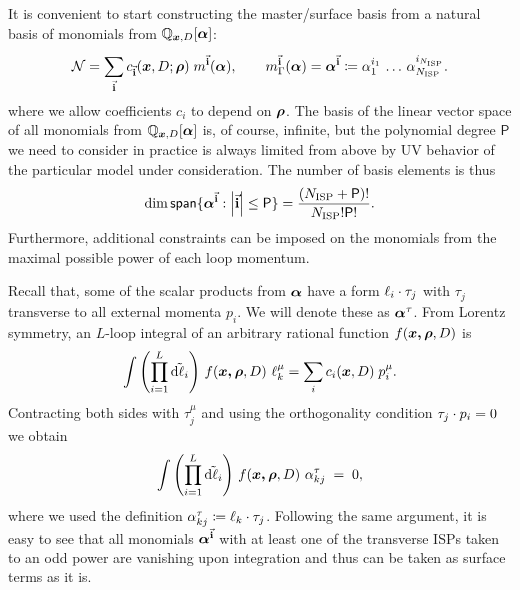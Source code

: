 
It is convenient to start constructing the master/surface basis from a natural basis of monomials from $\mathbb{Q}_{\vb*{x},D}[\vb*{\alpha}]$:
\begin{equation}
  \mathcal{N} = \sum_{\va{i}}^{} c_{\va{i}}(\vb*{x},D;\vb*{\rho}) \; m^{\va{i}}(\vb*{\alpha}), \qquad
  m_\Gamma^{\va{i}}(\vb*{\alpha}) = \vb*{\alpha}^{\va{i}} \coloneqq 
  \alpha_1^{i_1}\,\ldots{}\,\alpha_{N_\text{ISP} }^{i_{N_\text{ISP} }}.
\end{equation}
where we allow coefficients $c_{i}$ to depend on $\vb*{\rho}$.
The basis of the linear vector space of all monomials from $\mathbb{Q}_{\vb*{x},D}[\vb*{\alpha}]$ is, of course, infinite,
but the polynomial degree $\mathsf{P}$ we need to consider in practice is always limited from above by UV behavior of the particular model under consideration.
The number of basis elements is thus
\begin{equation} \label{eq:number_of_monomials}
  \dim{\mathsf{span}\{\vb*{\alpha}^{\va{i}} : \abs{\va{i}} \leq  \mathsf{P}\}} =  \frac{(N_\text{ISP} + \mathsf{P})!}{N_\text{ISP}! \mathsf{P}!}.
\end{equation}
Furthermore, additional constraints can be imposed on the monomials from the maximal possible power of each loop momentum.

Recall that, some of the scalar products from $\vb*{\alpha}$ have a form $\sp(\ell_i,\tau_j)$ with $\tau_j$ transverse to all external momenta $p_i$.
We will denote these as $\vb*{\alpha}^\tau$.
From Lorentz symmetry, an $L$-loop integral of an arbitrary rational function $f(\vb*{\vb*{x},\vb*{\rho}},D)$ is
\begin{equation} \label{eq:rank_1_tensor_integral}
  \int \qty(\prod_{i=1}^{L} \tilde{\dd{\ell_i}}){}~ f(\vb*{\vb*{x},\vb*{\rho}},D) ~ \ell_k^{\mu} = \sum_{i}^{}c_i(\vb*{x},D)\;p^\mu_i.
\end{equation}
Contracting both sides with $\tau^\mu_j$ and using the orthogonality condition $\sp(\tau_j,p_i)=0$ we obtain
\begin{equation}
  \int \qty(\prod_{i=1}^{L} \tilde{\dd{\ell_i}}){}~ f(\vb*{\vb*{x},\vb*{\rho}},D) ~ \alpha^{\tau}_{k j} \; = \; 0,
\end{equation}
where we used the definition $ \alpha^{\tau}_{k j} \coloneqq  \sp(\ell_k,\tau_j)$.
Following the same argument, it is easy to see that all monomials $\vb*{\alpha}^{\va{i}}$ with at least
one of the transverse ISPs taken to an odd power are vanishing upon integration and thus can be taken as surface terms as it is.

